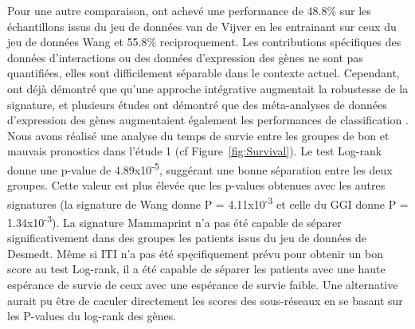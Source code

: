 		Pour une autre comparaison, \citet{Chuang2007} ont achevé une performance de 48.8\% sur les échantillons issus du jeu de données van de Vijver en les entrainant sur ceux du jeu de données Wang et 55.8\% reciproquement.
		Les contributions spécifiques des données d'interactions ou des données d'expression des gènes ne sont pas quantifiées, elles sont difficilement séparable dans le contexte actuel.
		Cependant, \citet{Chuang2007} ont déjà démontré que qu'une approche intégrative augmentait la robustesse de la signature, et plusieurs études ont démontré que des méta-analyses de données d'expression des gènes augmentaient également les performances de classification \citep{Fishel2007,Xu2005}.
		Nous avons réalisé une analyse du temps de survie entre les groupes de bon et mauvais pronostics dans l'étude 1 (cf Figure~\ref{fig:Survival}).
		Le test Log-rank donne une p-value de 4.89x10\textsuperscript{-5}, suggérant une bonne séparation entre les deux groupes.
		Cette valeur est plus élevée que les p-values obtenues avec les autres signatures (la signature de Wang donne P = 4.11x10\textsuperscript{-3} et celle du GGI donne P = 1.34x10\textsuperscript{-3}).
		La signature Mammaprint n'a pas été capable de séparer significativement dans des groupes les patients issus du jeu de données de Desmedt.
		Même si ITI n'a pas été spęcifiquement prévu pour obtenir un bon score au test Log-rank, il a été capable de séparer les patients avec une haute espérance de survie de ceux avec une espérance de survie faible.
		Une alternative aurait pu être de caculer directement les scores des sous-réseaux en se basant sur les P-values du log-rank des gènes.

